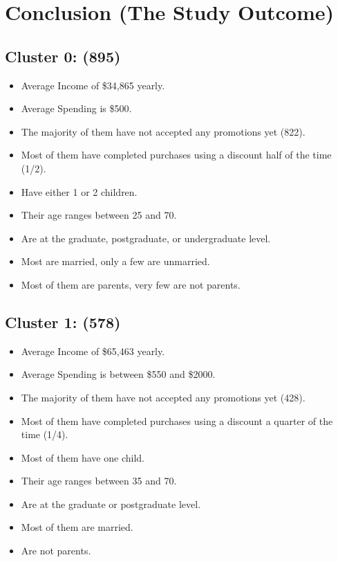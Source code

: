 \documentclass[12pt,a4paper]{report}
\begin{document}
\chapter*{Conclusion (The Study Outcome)}

\section*{Cluster 0: (895)}
\begin{itemize}
\item Average Income of \$34,865 yearly.
\item Average Spending is \$500.
\item The majority of them have not accepted any promotions yet (822).
\item Most of them have completed purchases using a discount half of the time (1/2).
\item Have either 1 or 2 children.
\item Their age ranges between 25 and 70.
\item Are at the graduate, postgraduate, or undergraduate level.
\item Most are married, only a few are unmarried.
\item Most of them are parents, very few are not parents.
\end{itemize}

\section*{Cluster 1: (578)}
\begin{itemize}
\item Average Income of \$65,463 yearly.
\item Average Spending is between \$550 and \$2000.
\item The majority of them have not accepted any promotions yet (428).
\item Most of them have completed purchases using a discount a quarter of the time (1/4).
\item Most of them have one child.
\item Their age ranges between 35 and 70.
\item Are at the graduate or postgraduate level.
\item Most of them are married.
\item Are not parents.
\end{itemize}
\end{document}
